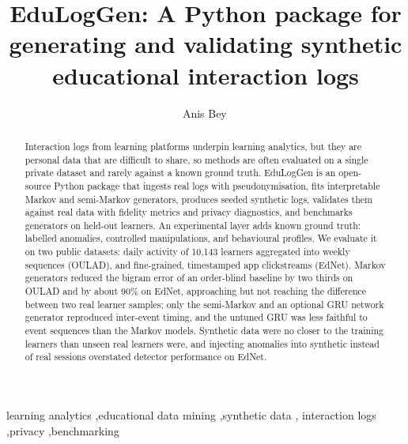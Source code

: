 \documentclass[preprint,12pt]{elsarticle}
\begin{document}
\begin{frontmatter}

\title{EduLogGen: A Python package for generating and validating synthetic educational interaction logs}

\author[a]{Anis Bey\,}
\address[a]{Higher School of Management Sciences, Annaba, Algeria}

\begin{abstract}
Interaction logs from learning platforms underpin learning analytics, but
they are personal data that are difficult to share, so methods are often
evaluated on a single private dataset and rarely against a known ground
truth. EduLogGen is an open-source Python package that ingests real logs with
pseudonymisation, fits interpretable Markov and semi-Markov generators,
produces seeded synthetic logs, validates them against real data with
fidelity metrics and privacy diagnostics, and benchmarks generators on
held-out learners. An experimental layer adds known ground truth: labelled
anomalies, controlled manipulations, and behavioural profiles. We evaluate
it on two public datasets: daily activity of 10{,}143 learners aggregated
into weekly sequences (OULAD), and fine-grained, timestamped app clickstreams
(EdNet). Markov generators reduced the bigram error of an order-blind
baseline by two thirds on OULAD and by about 90\% on EdNet, approaching but not
reaching the difference between two real learner samples; only the
semi-Markov and an optional GRU network generator reproduced inter-event
timing, and the untuned GRU was less faithful to event sequences than the
Markov models. Synthetic data were no closer to the training learners than
unseen real learners were, and
injecting anomalies into synthetic instead of real sessions overstated
detector performance on EdNet.
\end{abstract}

\begin{keyword}
learning analytics \sep educational data mining \sep synthetic data \sep
interaction logs \sep privacy \sep benchmarking
\end{keyword}

\end{frontmatter}

\end{document}
